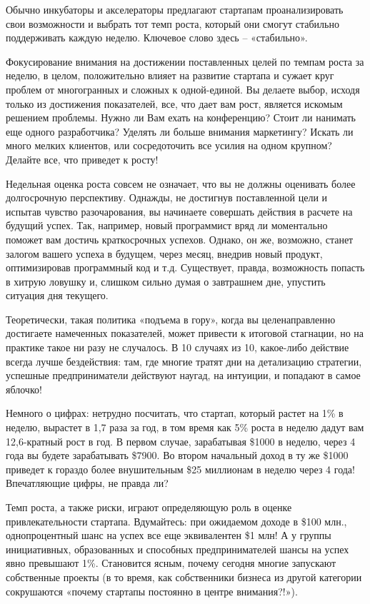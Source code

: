 \documentclass[ebook,12pt,oneside,openany]{memoir}
\begin{document}
Обычно инкубаторы и акселераторы предлагают стартапам проанализировать
свои возможности и выбрать тот темп роста, который они смогут
стабильно поддерживать каждую неделю. Ключевое слово здесь –
«стабильно».

Фокусирование внимания на достижении поставленных целей по темпам
роста за неделю, в целом, положительно влияет на развитие стартапа и
сужает круг проблем от многогранных и сложных к одной-единой. Вы
делаете выбор, исходя только из достижения показателей, все, что дает
вам рост, является искомым решением проблемы. Нужно ли Вам ехать на
конференцию? Стоит ли нанимать еще одного разработчика? Уделять ли
больше внимания маркетингу? Искать ли много мелких клиентов, или
сосредоточить все усилия на одном крупном? Делайте все, что приведет к
росту!

Недельная оценка роста совсем не означает, что вы не должны оценивать
более долгосрочную перспективу. Однажды, не достигнув поставленной
цели и испытав чувство разочарования, вы начинаете совершать действия
в расчете на будущий успех. Так, например, новый программист вряд ли
моментально поможет вам достичь краткосрочных успехов. Однако, он же,
возможно, станет залогом вашего успеха в будущем, через месяц, внедрив
новый продукт, оптимизировав программный код и т.д. Существует,
правда, возможность попасть в хитрую ловушку и, слишком сильно думая о
завтрашнем дне, упустить ситуация дня текущего.

Теоретически, такая политика «подъема в гору», когда вы
целенаправленно достигаете намеченных показателей, может привести к
итоговой стагнации, но на практике такое ни разу не случалось. В 10
случаях из 10, какое-либо действие всегда лучше бездействия: там, где
многие тратят дни на детализацию стратегии, успешные предприниматели
действуют наугад, на интуиции, и попадают в самое яблочко!

Немного о цифрах: нетрудно посчитать, что стартап, который растет на
1\% в неделю, вырастет в 1,7 раза за год, в том время как 5\% роста в
неделю дадут вам 12,6-кратный рост в год. В первом случае, зарабатывая
\$1000 в неделю, через 4 года вы будете зарабатывать \$7900. Во втором
начальный доход в ту же \$1000 приведет к гораздо более внушительным
\$25 миллионам в неделю через 4 года! Впечатляющие цифры, не правда
ли?

Темп роста, а также риски, играют определяющую роль в оценке
привлекательности стартапа. Вдумайтесь: при ожидаемом доходе в \$100
млн., однопроцентный шанс на успех все еще эквивалентен \$1 млн! А у
группы инициативных, образованных и способных предпринимателей шансы
на успех явно превышают 1\%. Становится ясным, почему сегодня многие
запускают собственные проекты (в то время, как собственники бизнеса из
другой категории сокрушаются «почему стартапы постоянно в центре
внимания?!»).
\end{document}
